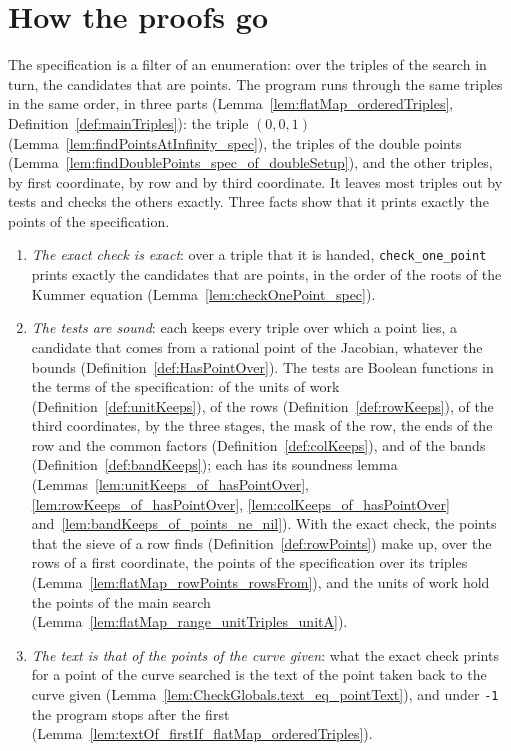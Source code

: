 \section{How the proofs go}\label{sec:overviewProofs}

The specification is a filter of an enumeration: over the triples of the search in turn, the
candidates that are points. The program runs through the same triples in the same order, in three
parts (Lemma~\ref{lem:flatMap_orderedTriples}, Definition~\ref{def:mainTriples}): the triple $(0, 0,
1)$ (Lemma~\ref{lem:findPointsAtInfinity_spec}), the triples of the double points
(Lemma~\ref{lem:findDoublePoints_spec_of_doubleSetup}), and the other triples, by first coordinate,
by row and by third coordinate. It leaves most triples out by tests and checks the others exactly.
Three facts show that it prints exactly the points of the specification.
\begin{enumerate}
  \item \emph{The exact check is exact}: over a triple that it is handed, \texttt{check\_one\_point}
    prints exactly the candidates that are points, in the order of the roots of the Kummer equation
    (Lemma~\ref{lem:checkOnePoint_spec}).
  \item \emph{The tests are sound}: each keeps every triple over which a point lies, a candidate
    that comes from a rational point of the Jacobian, whatever the bounds
    (Definition~\ref{def:HasPointOver}). The tests are Boolean functions in the terms of the
    specification: of the units of work (Definition~\ref{def:unitKeeps}), of the rows
    (Definition~\ref{def:rowKeeps}), of the third coordinates, by the three stages, the mask of the
    row, the ends of the row and the common factors (Definition~\ref{def:colKeeps}), and of the
    bands (Definition~\ref{def:bandKeeps}); each has its soundness lemma
    (Lemmas~\ref{lem:unitKeeps_of_hasPointOver}, \ref{lem:rowKeeps_of_hasPointOver},
    \ref{lem:colKeeps_of_hasPointOver} and~\ref{lem:bandKeeps_of_points_ne_nil}). With the exact
    check, the points that the sieve of a row finds (Definition~\ref{def:rowPoints}) make up, over
    the rows of a first coordinate, the points of the specification over its triples
    (Lemma~\ref{lem:flatMap_rowPoints_rowsFrom}), and the units of work hold the points of the main
    search (Lemma~\ref{lem:flatMap_range_unitTriples_unitA}).
  \item \emph{The text is that of the points of the curve given}: what the exact check prints for a
    point of the curve searched is the text of the point taken back to the curve given
    (Lemma~\ref{lem:CheckGlobals.text_eq_pointText}), and under \verb|-1| the program stops after
    the first (Lemma~\ref{lem:textOf_firstIf_flatMap_orderedTriples}).
\end{enumerate}


